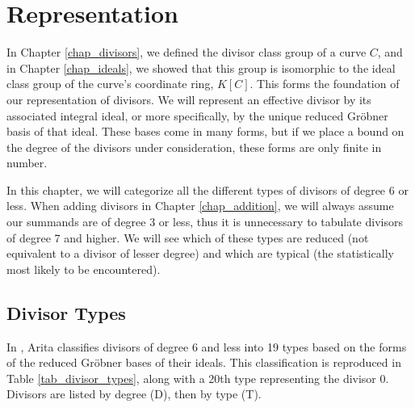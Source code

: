 
\section{Representation}
\label{chap_representation}

In Chapter \ref{chap_divisors}, we defined the divisor class group of a curve $C$,
and in Chapter \ref{chap_ideals}, we showed that this group is isomorphic
to the ideal class group of the curve's coordinate ring, $K[C]$.
This forms the foundation of our representation of divisors.
We will represent an effective divisor by its associated integral ideal,
or more specifically, by the unique reduced Gr\"obner basis of that ideal.
These bases come in many forms, but if we place a bound on the degree of the divisors under consideration,
these forms are only finite in number.

In this chapter, we will categorize all the different types of divisors of degree 6 or less.
When adding divisors in Chapter \ref{chap_addition},
we will always assume our summands are of degree 3 or less,
thus it is unnecessary to tabulate divisors of degree 7 and higher.
We will see which of these types are reduced (not equivalent to a divisor of lesser degree)
and which are typical (the statistically most likely to be encountered).




\subsection{Divisor Types}

In \cite{arita05-2}, Arita classifies divisors of degree 6 and less into 19 types
based on the forms of the reduced Gr\"obner bases of their ideals.
This classification is reproduced in Table \ref{tab_divisor_types},
along with a 20th type representing the divisor 0.
Divisors are listed by degree (D), then by type (T).

